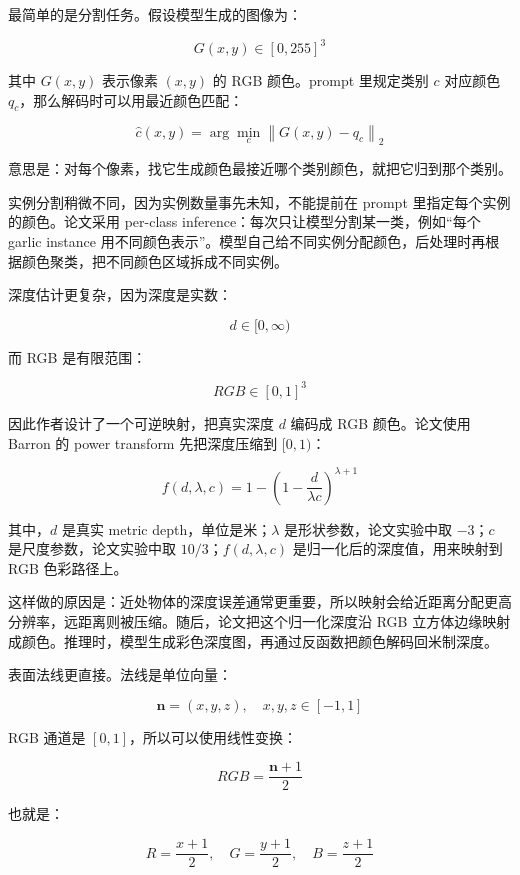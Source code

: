 最简单的是分割任务。假设模型生成的图像为：

\[
G(x, y) \in [0, 255]^3
\]

其中 \(G(x, y)\) 表示像素 \((x, y)\) 的 RGB 颜色。prompt 里规定类别 \(c\) 对应颜色 \(q_c\)，那么解码时可以用最近颜色匹配：

\[
\hat{c}(x, y) = \arg\min_c \left\|G(x, y) - q_c\right\|_2
\]

意思是：对每个像素，找它生成颜色最接近哪个类别颜色，就把它归到那个类别。

实例分割稍微不同，因为实例数量事先未知，不能提前在 prompt 里指定每个实例的颜色。论文采用 per-class inference：每次只让模型分割某一类，例如``每个 garlic instance 用不同颜色表示''。模型自己给不同实例分配颜色，后处理时再根据颜色聚类，把不同颜色区域拆成不同实例。

深度估计更复杂，因为深度是实数：

\[
d \in [0, \infty)
\]

而 RGB 是有限范围：

\[
RGB \in [0, 1]^3
\]

因此作者设计了一个可逆映射，把真实深度 \(d\) 编码成 RGB 颜色。论文使用 Barron 的 power transform 先把深度压缩到 \([0, 1)\)：

\[
f(d, \lambda, c) = 1 - \left(1 - \frac{d}{\lambda c}\right)^{\lambda + 1}
\]

其中，\(d\) 是真实 metric depth，单位是米；\(\lambda\) 是形状参数，论文实验中取 \(-3\)；\(c\) 是尺度参数，论文实验中取 \(10/3\)；\(f(d,\lambda,c)\) 是归一化后的深度值，用来映射到 RGB 色彩路径上。

这样做的原因是：近处物体的深度误差通常更重要，所以映射会给近距离分配更高分辨率，远距离则被压缩。随后，论文把这个归一化深度沿 RGB 立方体边缘映射成颜色。推理时，模型生成彩色深度图，再通过反函数把颜色解码回米制深度。

表面法线更直接。法线是单位向量：

\[
\mathbf{n} = (x, y, z), \quad x, y, z \in [-1, 1]
\]

RGB 通道是 \([0, 1]\)，所以可以使用线性变换：

\[
RGB = \frac{\mathbf{n} + 1}{2}
\]

也就是：

\[
R = \frac{x + 1}{2}, \quad G = \frac{y + 1}{2}, \quad B = \frac{z + 1}{2}
\]

